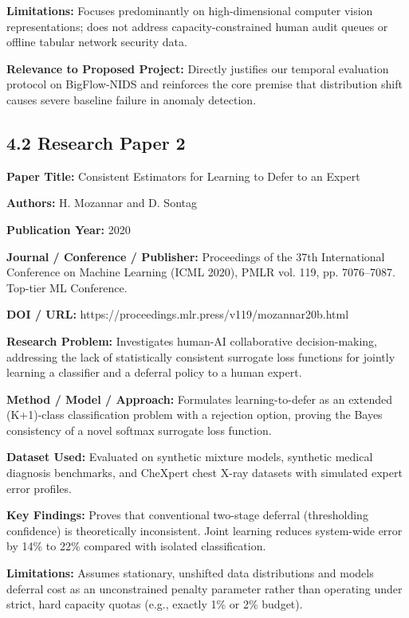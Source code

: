 \textbf{Limitations:} Focuses predominantly on high-dimensional computer vision representations; does not address capacity-constrained human audit queues or offline tabular network security data.

\textbf{Relevance to Proposed Project:} Directly justifies our temporal evaluation protocol on BigFlow-NIDS and reinforces the core premise that distribution shift causes severe baseline failure in anomaly detection.

\subsection{4.2 Research Paper 2}

\textbf{Paper Title:} Consistent Estimators for Learning to Defer to an Expert

\textbf{Authors:} H. Mozannar and D. Sontag

\textbf{Publication Year:} 2020

\textbf{Journal / Conference / Publisher:} Proceedings of the 37th International Conference on Machine Learning (ICML 2020), PMLR vol. 119, pp. 7076--7087. Top-tier ML Conference.

\textbf{DOI / URL:} https://proceedings.mlr.press/v119/mozannar20b.html

\textbf{Research Problem:} Investigates human-AI collaborative decision-making, addressing the lack of statistically consistent surrogate loss functions for jointly learning a classifier and a deferral policy to a human expert.

\textbf{Method / Model / Approach:} Formulates learning-to-defer as an extended (K+1)-class classification problem with a rejection option, proving the Bayes consistency of a novel softmax surrogate loss function.

\textbf{Dataset Used:} Evaluated on synthetic mixture models, synthetic medical diagnosis benchmarks, and CheXpert chest X-ray datasets with simulated expert error profiles.

\textbf{Key Findings:} Proves that conventional two-stage deferral (thresholding confidence) is theoretically inconsistent. Joint learning reduces system-wide error by 14\% to 22\% compared with isolated classification.

\textbf{Limitations:} Assumes stationary, unshifted data distributions and models deferral cost as an unconstrained penalty parameter rather than operating under strict, hard capacity quotas (e.g., exactly 1\% or 2\% budget).

